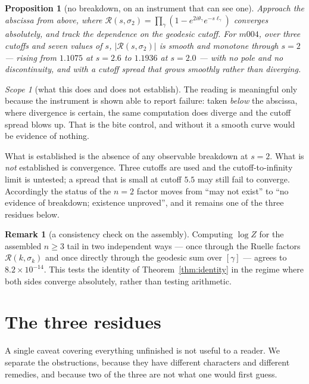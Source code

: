 \documentclass[11pt,a4paper]{article}
\newtheorem{proposition}[theorem]{Proposition}
\theoremstyle{definition}
\newtheorem{remark}[theorem]{Remark}
\theoremstyle{remark}
\newtheorem{scope}[theorem]{Scope}
\newcommand{\Rz}{\mathcal{R}}
\begin{document}
\begin{proposition}[no breakdown, on an instrument that can see one]\label{prop:n2}
Approach the abscissa from above, where $\Rz(s,\sigma_2)=\prod_\gamma(1-e^{2i\theta_\gamma}
e^{-s\ell_\gamma})$ converges absolutely, and track the dependence on the geodesic cutoff. For
$m004$, over three cutoffs and seven values of $s$, $|\Rz(s,\sigma_2)|$ is smooth and monotone
through $s=2$ --- rising from $1.1075$ at $s=2.6$ to $1.1936$ at $s=2.0$ --- with no pole and no
discontinuity, and with a cutoff spread that grows smoothly rather than diverging.
\end{proposition}

\begin{scope}[what this does and does not establish]\label{sc:n2}
The reading is meaningful only because the instrument is shown able to report failure: taken
\emph{below} the abscissa, where divergence is certain, the same computation does diverge and
the cutoff spread blows up. That is the bite control, and without it a smooth curve would be
evidence of nothing.

What is established is the absence of any observable breakdown at $s=2$. What is \emph{not}
established is convergence. Three cutoffs are used and the cutoff-to-infinity limit is untested;
a spread that is small at cutoff $5.5$ may still fail to converge. Accordingly the status of the
$n=2$ factor moves from ``may not exist'' to ``no evidence of breakdown; existence unproved'',
and it remains one of the three residues below.
\end{scope}

\begin{remark}[a consistency check on the assembly]
Computing $\log Z$ for the assembled $n\ge3$ tail in two independent ways --- once through the
Ruelle factors $\Rz(k,\sigma_k)$ and once directly through the geodesic sum over $[\gamma]$ ---
agrees to $8.2\times10^{-14}$. This tests the identity of Theorem~\ref{thm:identity} in the
regime where both sides converge absolutely, rather than testing arithmetic.
\end{remark}

\section{The three residues}\label{sec:residues}

A single caveat covering everything unfinished is not useful to a reader. We separate the
obstructions, because they have different characters and different remedies, and because two of
the three are not what one would first guess.
\end{document}
